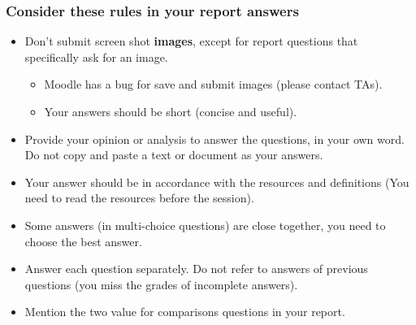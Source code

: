 \documentclass[aspectratio=169,15pt]{beamer}
\begin{document}
\begin{frame}
    \frametitle{Consider these rules in your report answers}

    \begin{itemize}
        \item Don’t submit screen shot \textbf{images}, except for report questions that specifically ask for an image.
        \begin{itemize}
            \item Moodle has a bug for save and submit images (please contact TAs).
            \item Your answers should be short (concise and useful).
        \end{itemize}
        \item Provide your opinion or analysis to answer the questions, in your own word. Do not copy and paste a text or document as your answers.
        \item Your answer should be in accordance with the resources and definitions (You need to read the resources before the session).
        \item Some answers (in multi-choice questions) are close together, you need to choose the best answer.
        \item Answer each question separately. Do not refer to answers of previous questions  (you miss the grades of incomplete answers).
        \item Mention the two value for comparisons questions in your report.
    \end{itemize}

\end{frame}
\end{document}
